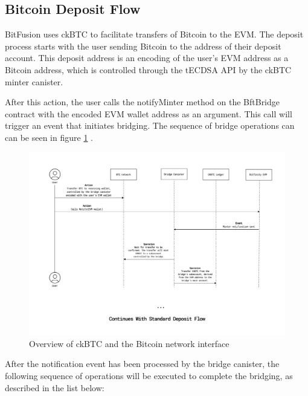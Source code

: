 \documentclass{article}
\begin{document}
\subsection{Bitcoin Deposit Flow}

BitFusion uses ckBTC to facilitate transfers of Bitcoin to the EVM. The deposit process starts with the user sending Bitcoin to the address of their deposit account. This deposit address is an encoding of the user's EVM address as a Bitcoin address, which is controlled through the tECDSA API by the ckBTC minter canister. 

After this action, the user calls the notifyMinter method on the BftBridge contract with the encoded EVM wallet address as an argument. This call will trigger an event that initiates bridging. The sequence of bridge operations can can be seen in figure \ref{fig:bitcoin} . 

    \begin{figure}[h]
        \centering
         \includegraphics[width=1\textwidth]{bitcoin.png}
        \caption{Overview of ckBTC and the Bitcoin network interface }
        \label{fig:bitcoin}
    \end{figure}

 After the notification event has been processed by the bridge canister, the following sequence of operations will be executed to complete the bridging, as described in the list below: 
 
\end{document}
